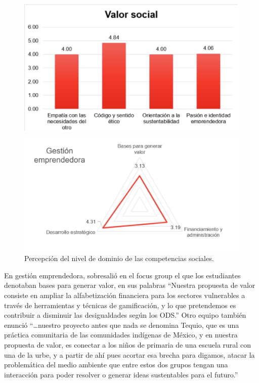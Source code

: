 \documentclass[spanish]{textolivre}
\begin{document}
\begin{figure}[htbp]
\begin{minipage}[t]{0.47\textwidth}
\subcaption{}
\end{minipage}
\hfill
\begin{minipage}[t]{0.47\textwidth}
\includegraphics[width=\linewidth]{fig5-4.png}
\subcaption{}
\end{minipage}
\hfill
\begin{minipage}[t]{0.65\textwidth}
\includegraphics[width=\linewidth]{fig5-5.png}
\subcaption{}
\end{minipage}
\caption{Percepción del nivel de dominio de las competencias sociales.}
\label{fig:twosubs}
\end{figure}

En gestión emprendedora, sobresalió en el focus group el que los estudiantes denotaban bases para generar valor, en sus palabras “Nuestra propuesta de valor consiste en ampliar la alfabetización financiera para los sectores vulnerables a través de herramientas y técnicas de gamificación, y lo que pretendemos es contribuir a disminuir las desigualdades según los ODS.” Otro equipo también enunció “…nuestro proyecto antes que nada se denomina Tequio, que es una práctica comunitaria de las comunidades indígenas de México, y en nuestra propuesta de valor, es conectar a los niños de primaria de una escuela rural con una de la urbe, y a partir de ahí pues acortar esa brecha para digamos, atacar la problemática del medio ambiente que entre estos dos grupos tengan una interacción para poder resolver o generar ideas sustentables para el futuro.” 
\end{document}
